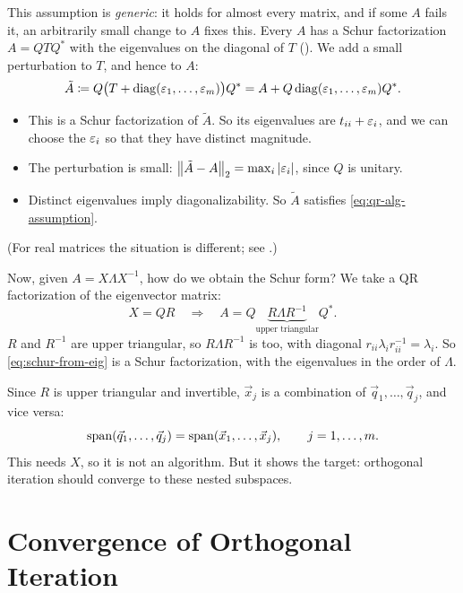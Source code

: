 This assumption is \emph{generic}: it holds for almost every matrix, and if some $A$ fails it, an arbitrarily small change to $A$ fixes this. Every $A$ has a Schur factorization $A = QTQ^\ast$ with the eigenvalues on the diagonal of $T$ (). We add a small perturbation to $T$, and hence to $A$:
\begin{equation}
  \tilde{A} \coloneqq Q\bigl(T + \operatorname{diag}(\varepsilon_1, \dots, \varepsilon_m)\bigr)Q^\ast = A + Q\operatorname{diag}(\varepsilon_1, \dots, \varepsilon_m)Q^\ast.
\end{equation}
\begin{itemize}
  \item This is a Schur factorization of $\tilde{A}$. So its eigenvalues are $t_{ii} + \varepsilon_i$, and we can choose the $\varepsilon_i$ so that they have distinct magnitude.
  \item The perturbation is small: $\left\lVert \tilde{A} - A \right\rVert_2 = \max_i\left\lvert \varepsilon_i \right\rvert$, since $Q$ is unitary.
  \item Distinct eigenvalues imply diagonalizability. So $\tilde{A}$ satisfies \cref{eq:qr-alg-assumption}.
\end{itemize}
(For real matrices the situation is different; see .)

Now, given $A = X\Lambda X^{-1}$, how do we obtain the Schur form? We take a QR factorization of the eigenvector matrix:
\begin{equation}
  X = QR \quad\Longrightarrow\quad A = Q\underbrace{R\Lambda R^{-1}}_{\text{upper triangular}}Q^\ast.
  \label{eq:schur-from-eig}
\end{equation}
$R$ and $R^{-1}$ are upper triangular, so $R\Lambda R^{-1}$ is too, with diagonal $r_{ii}\lambda_ir_{ii}^{-1} = \lambda_i$. So \cref{eq:schur-from-eig} is a Schur factorization, with the eigenvalues in the order of $\Lambda$.

Since $R$ is upper triangular and invertible, $\vec{x}_j$ is a combination of $\vec{q}_1, \dots, \vec{q}_j$, and vice versa:
\begin{equation}
  \operatorname{span}(\vec{q}_1, \dots, \vec{q}_j) = \operatorname{span}(\vec{x}_1, \dots, \vec{x}_j), \qquad j = 1, \dots, m.
  \label{eq:schur-nested}
\end{equation}
This needs $X$, so it is not an algorithm. But it shows the target: orthogonal iteration should converge to these nested subspaces.

\section{Convergence of Orthogonal Iteration}
\label{sec:orth-iter-conv}

